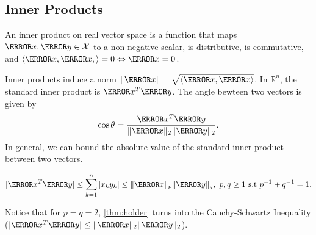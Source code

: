 \subsection{Inner Products}
\begin{definition}
  An inner product on real vector space is a function that maps $\V{x},\V{y} \in \mathcal{X}$ to a non-negative scalar, is distributive, is commutative, and $\langle \V{x}, \V{x}, \rangle = 0 \Leftrightarrow \V{x}=0$.
  \label{defn:inner-product}
\end{definition}
Inner products induce a norm $\norm{\V{x}} = \sqrt{\langle \V{x}, \V{x} \rangle}$.
In $\mathbb{R}^n$, the standard inner product is $\V{x}^T\V{y}$.
The angle bewteen two vectors is given by
\[
	\cos\theta = \frac{\V{x}^T\V{y}}{\norm{\V{x}}_2\norm{\V{y}}_2}.
\]
In general, we can bound the absolute value of the standard inner product between two vectors.
\begin{theorem}
  \[
	|\V{x}^T\V{y}| \leq \sum_{k=1}^n |x_ky_k| \leq \norm{\V{x}}_p\norm{\V{y}}_q,\ p, q\geq 1 \text{ s.t } p^{-1}+q^{-1}=1.
  \]
  \label{thm:holder}
\end{theorem}
Notice that for $p=q = 2$, \cref{thm:holder} turns into the Cauchy-Schwartz Inequality ($|\V{x}^T\V{y}| \leq \|\V{x}\|_2\|\V{y}\|_2$).
